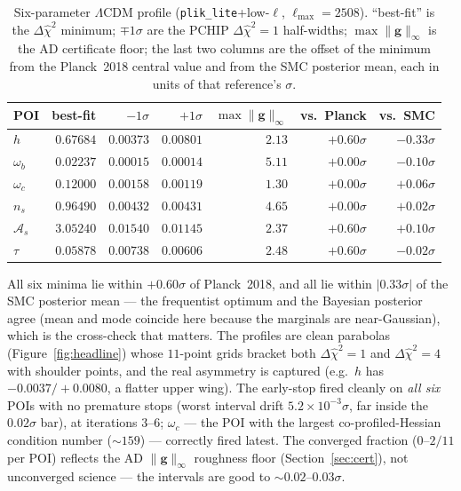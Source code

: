 \documentclass[11pt]{article}
\newcommand{\code}[1]{\texttt{\small #1}}
\newcommand{\dchisq}{\Delta\hat\chi^2}
\newcommand{\ginf}{\lVert \bm{g}\rVert_\infty}
\newcommand{\Lmax}{\ell_{\max}}
\begin{document}
\begin{table}[h]
\centering
\caption{Six-parameter $\Lambda$CDM profile (\code{plik\_lite}+low-$\ell$,
$\Lmax=2508$). ``best-fit'' is the $\dchisq$ minimum;
$\mp1\sigma$ are the PCHIP $\dchisq=1$ half-widths;
$\max\ginf$ is the AD certificate floor; the last two columns are the
offset of the minimum from the Planck~2018 central value and from the SMC
posterior mean, each in units of that reference's $\sigma$.}
\label{tab:headline}
\begin{tabular}{lrrrrrr}
\toprule
POI & best-fit & $-1\sigma$ & $+1\sigma$ & $\max\ginf$ & vs.\ Planck & vs.\ SMC\\
\midrule
$h$            & $0.67684$ & $0.00373$ & $0.00801$ & $2.13$ & $+0.60\sigma$ & $-0.33\sigma$\\
$\omega_b$     & $0.02237$ & $0.00015$ & $0.00014$ & $5.11$ & $+0.00\sigma$ & $-0.10\sigma$\\
$\omega_c$     & $0.12000$ & $0.00158$ & $0.00119$ & $1.30$ & $+0.00\sigma$ & $+0.06\sigma$\\
$n_s$          & $0.96490$ & $0.00432$ & $0.00431$ & $4.65$ & $+0.00\sigma$ & $+0.02\sigma$\\
$\mathcal A_s$ & $3.05240$ & $0.01540$ & $0.01145$ & $2.37$ & $+0.60\sigma$ & $+0.10\sigma$\\
$\tau$         & $0.05878$ & $0.00738$ & $0.00606$ & $2.48$ & $+0.60\sigma$ & $-0.02\sigma$\\
\bottomrule
\end{tabular}
\end{table}

All six minima lie within $+0.60\sigma$ of Planck~2018, and all lie within
$|0.33\sigma|$ of the SMC posterior mean --- the frequentist optimum and
the Bayesian posterior agree (mean and mode coincide here because the
marginals are near-Gaussian), which is the cross-check that matters. The
profiles are clean parabolas (Figure~\ref{fig:headline}) whose $11$-point
grids bracket both $\dchisq=1$ and $\dchisq=4$ with shoulder points, and
the real asymmetry is captured (e.g.\ $h$ has $-0.0037/+0.0080$, a flatter
upper wing). The early-stop fired cleanly on \emph{all six} POIs with no
premature stops (worst interval drift $5.2\times10^{-3}\sigma$, far inside
the $0.02\sigma$ bar), at iterations $3$--$6$; $\omega_c$ --- the POI with
the largest co-profiled-Hessian condition number ($\sim159$) --- correctly
fired latest. The converged fraction ($0$--$2/11$ per POI) reflects the AD
$\ginf$ roughness floor (Section~\ref{sec:cert}), not unconverged science
--- the intervals are good to $\sim0.02$--$0.03\sigma$.
\end{document}
